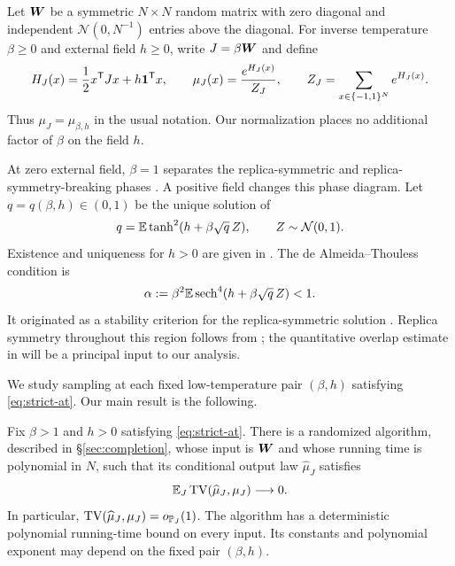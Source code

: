 \documentclass[11pt,reqno]{amsart}
\newcommand{\TV}{\operatorname{TV}}
\newcommand{\sech}{\operatorname{sech}}
\begin{document}
Let ${\boldsymbol{W}}$ be a symmetric $N\times N$ random matrix with zero diagonal and independent $\mathcal N(0,N^{-1})$ entries above the diagonal. For inverse temperature $\beta\ge0$ and external field $h\ge0$, write $J=\beta{\boldsymbol{W}}$ and define
\begin{equation*}
 H_J(x)=\frac12x^{\mathsf T}Jx+h{\boldsymbol{1}}^{\mathsf T}x,
 \qquad \mu_J(x)=\frac{e^{H_J(x)}}{Z_J},
 \qquad Z_J=\sum_{x\in\{-1,1\}^N}e^{H_J(x)}.
\end{equation*}
Thus $\mu_J=\mu_{\beta,h}$ in the usual notation. Our normalization places no additional factor of $\beta$ on the field $h$.

At zero external field, $\beta=1$ separates the replica-symmetric and replica-symmetry-breaking phases \cite{talagrand2010mean,panchenko2013sherrington}. A positive field changes this phase diagram. Let $q=q(\beta,h)\in(0,1)$ be the unique solution of
\begin{equation}\label{eq:original-fixed-point}
 q={\mathbb{E}}\tanh^2(h+\beta\sqrt q\,Z),\qquad Z\sim\mathcal N(0,1).
\end{equation}
Existence and uniqueness for $h>0$ are given in \cite[Proposition~1.3.8]{talagrand2010mean}. The de Almeida--Thouless condition is
\begin{equation}\label{eq:strict-at}
 \alpha:=\beta^2\bbE\sech^4(h+\beta\sqrt q\,Z)<1.
\end{equation}
It originated as a stability criterion for the replica-symmetric solution \cite{dealmeida1978stability}. Replica symmetry throughout this region follows from \cite[Theorem~1.1]{lopatto2026replica}; the quantitative overlap estimate in \cite[Theorem~1.1]{kusuoka2026quantitative} will be a principal input to our analysis.

We study sampling at each fixed low-temperature pair $(\beta,h)$ satisfying \eqref{eq:strict-at}. Our main result is the following.

\begin{thm}\label{thm:main}
Fix $\beta>1$ and $h>0$ satisfying \eqref{eq:strict-at}. There is a randomized algorithm, described in \S\ref{sec:completion}, whose input is ${\boldsymbol{W}}$ and whose running time is polynomial in $N$, such that its conditional output law $\widehat\mu_J$ satisfies
\begin{equation}\label{eq:main-tv}
 \bbE_J\TV(\widehat\mu_J,\mu_J)\longrightarrow0.
\end{equation}
In particular, $\TV(\widehat\mu_J,\mu_J)=o_{\bbP_J}(1)$. The algorithm has a deterministic polynomial running-time bound on every input. Its constants and polynomial exponent may depend on the fixed pair $(\beta,h)$.
\end{thm}
\end{document}
